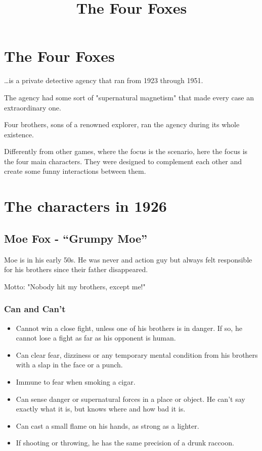 \documentclass[11pt]{article}
\title{The Four Foxes}
\begin{document}
\tableofcontents

\maketitle

\section{The Four Foxes}
\label{sec:intro}
\dots is a private detective agency that ran from 1923 through 1951.

The agency had some sort of "supernatural magnetism" that made every case an extraordinary one.

Four brothers, sons of a renowned explorer, ran the agency during its whole existence.

Differently from other games, where the focus is the scenario, here the focus is the four main characters. They were designed to complement each other and create some funny interactions between them.

\section{The characters in 1926}
\label{sec:characters}

\subsection{Moe Fox - \enquote{Grumpy Moe}}
\label{sec:moe}
Moe is in his early 50s. He was never and action guy but always felt responsible for his brothers since their father disappeared.

Motto: "Nobody hit my brothers, except me!"

\subsubsection{Can and Can't}
\label{sec:moe-can}
\begin{itemize}
\item Cannot win a close fight, unless one of his brothers is in danger. If so, he cannot lose a fight as far as his opponent is human.
\item Can clear fear, dizziness or any temporary mental condition from his brothers with a slap in the face or a punch.
\item Immune to fear when smoking a cigar.
\item Can sense danger or supernatural forces in a place or object. He can't say exactly what it is, but knows where and how bad it is.
\item Can cast a small flame on his hands, as strong as a lighter.
\item If shooting or throwing, he has the same precision of a drunk raccoon.
\end{itemize}
\end{document}
